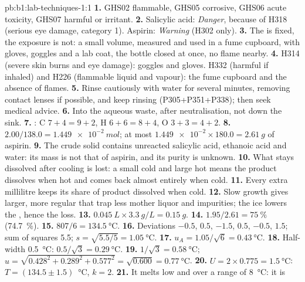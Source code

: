 \begin{solution}{pb:b1:lab-techniques-1:1}
\textbf{1.} GHS02 flammable, GHS05 corrosive, GHS06 acute toxicity, GHS07
harmful or irritant.
\textbf{2.} Salicylic acid: \emph{Danger}, because of H318 (serious eye
damage, category 1). Aspirin: \emph{Warning} (H302 only).
\textbf{3.} The  is fixed, the exposure is not: a small volume,
measured and used in a fume cupboard, with gloves, goggles and a lab coat,
the bottle closed at once, no flame nearby.
\textbf{4.} H314 (severe skin burns and eye damage): goggles and gloves.
H332 (harmful if inhaled) and H226 (flammable liquid and vapour): the fume
cupboard and the absence of flames.
\textbf{5.} Rinse cautiously with water for several minutes, removing
contact lenses if possible, and keep rinsing (P305+P351+P338); then seek
medical advice.
\textbf{6.} Into the aqueous waste, after neutralisation, not down the
sink.
\textbf{7.} : C $7 + 4 = 9 + 2$,
H $6 + 6 = 8 + 4$, O $3 + 3 = 4 + 2$.
\textbf{8.} $2.00/138.0 = \qty{1.449e-2}{mol}$; at most
$\num{1.449e-2} \times 180.0 = \qty{2.61}{g}$ of aspirin.
\textbf{9.} The crude solid contains unreacted salicylic acid, ethanoic
acid and water: its mass is not that of aspirin, and its purity is
unknown.
\textbf{10.} What stays dissolved after cooling is lost: a  small
cold and large hot means the product dissolves when hot and comes back
almost entirely when cold.
\textbf{11.} Every extra millilitre keeps its share of product dissolved
when cold.
\textbf{12.} Slow growth gives larger, more regular  that trap
less mother liquor and impurities; the ice lowers the , hence
the loss.
\textbf{13.} $\qty{0.045}{L} \times \qty{3.3}{g/L} = \qty{0.15}{g}$.
\textbf{14.} $1.95/2.61 = \qty{75}{\percent}$ (\qty{74.7}{\percent}).
\textbf{15.} $807/6 = \qty{134.5}{\celsius}$.
\textbf{16.} Deviations $-0.5$, $0.5$, $-1.5$, $0.5$, $-0.5$, $1.5$; sum of
squares 5.5; $s = \sqrt{5.5/5} = \qty{1.05}{\celsius}$.
\textbf{17.} $u_A = 1.05/\sqrt6 = \qty{0.43}{\celsius}$.
\textbf{18.} Half-width \qty{0.5}{\celsius}: $0.5/\sqrt3 = \qty{0.29}{\celsius}$.
\textbf{19.} $1/\sqrt3 = \qty{0.58}{\celsius}$;
$u = \sqrt{0.428^2 + 0.289^2 + 0.577^2} = \sqrt{0.600} = \qty{0.77}{\celsius}$.
\textbf{20.} $U = 2 \times 0.775 = \qty{1.5}{\celsius}$:
$T = (134.5 \pm 1.5)$~\unit{\celsius}, $k = 2$.
\textbf{21.} It melts low and over a range of \qty{8}{\celsius}: it is

\end{solution}
